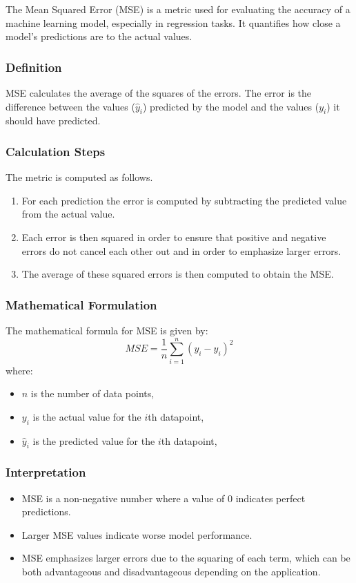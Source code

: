 The Mean Squared Error (MSE) is a metric used for evaluating the accuracy of a machine learning model, especially in regression tasks. It quantifies how close a model's predictions are to the actual values.

\subsubsection{Definition}
MSE calculates the average of the squares of the errors. The error is the difference between the values (\(\hat{y}_i\)) predicted by the model and the values (\(y_i\)) it should have predicted.

\subsubsection{Calculation Steps}
The metric is computed as follows.
\begin{enumerate}
	\item For each prediction the error is computed by subtracting the predicted value from the actual value.
	\item Each error is then squared in order to ensure that positive and negative errors do not cancel each other out and in order to emphasize larger errors.
	\item The average of these squared errors is then computed to obtain the MSE.
\end{enumerate}

\subsubsection{Mathematical Formulation}
The mathematical formula for MSE is given by:
\begin{equation}
	MSE = \frac{1}{n} \sum_{i=1}^{n} (y_i - \hat{y}_i)^2
\end{equation}
where:
\begin{itemize}
	\item \(n\) is the number of data points,
	\item \(y_i\) is the actual value for the \(i\)th datapoint,
	\item \(\hat{y}_i\) is the predicted value for the \(i\)th datapoint,
\end{itemize}

\subsubsection{Interpretation}
\begin{itemize}
	\item MSE is a non-negative number where a value of 0 indicates perfect predictions.
	\item Larger MSE values indicate worse model performance.
	\item MSE emphasizes larger errors due to the squaring of each term, which can be both advantageous and disadvantageous depending on the application.
\end{itemize}

